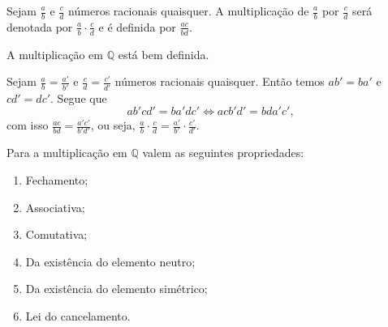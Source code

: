 \documentclass[../main.tex]{subfiles}
\begin{document}
\begin{defi}\label{rac-def-produto}
    Sejam $\frac{a}{b}$ e $\frac{c}{d}$ números racionais quaisquer. A multiplicação de $\frac{a}{b}$ por $\frac{c}{d}$ será denotada por $\frac{a}{b} \cdot \frac{c}{d}$ e é definida por $\frac{ac}{bd}$.
\end{defi}
\begin{teo}\label{rac-teo-produtoBemDefinido}
    A multiplicação em $\mathbb{Q}$ está bem definida.
\end{teo}
\begin{dem}
    Sejam $\frac{a}{b} = \frac{a'}{b'}$ e $\frac{c}{d} = \frac{c'}{d'}$ números racionais quaisquer. Então temos $ab' = ba'$ e $cd' = dc'$. Segue que \[ ab'cd' = ba'dc' \iff acb'd' = bda'c', \] 
    com isso $\frac{ac}{bd} = \frac{a'c'}{b'd'}$, ou seja, $\frac{a}{b} \cdot \frac{c}{d} = \frac{a'}{b'} \cdot \frac{c'}{d'}$.
\end{dem}
\begin{teo}\label{rac-teo-produtoPropriedades}
    Para a multiplicação em $\mathbb{Q}$ valem as seguintes propriedades:
    \begin{enumerate}[label=(\roman*)]
        \item Fechamento;
        \item Associativa;
        \item Comutativa;
        \item Da existência do elemento neutro; 
        \item Da existência do elemento simétrico;
        \item Lei do cancelamento.
    \end{enumerate}
\end{teo}
\end{document}
